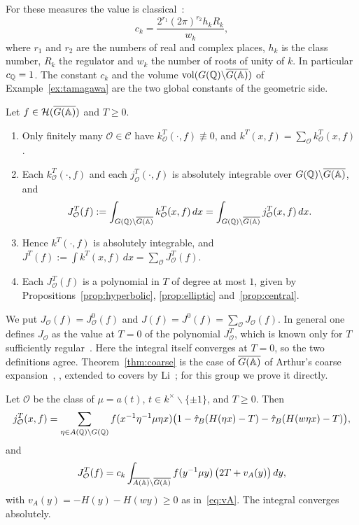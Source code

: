 For these measures the value is classical~\cite{Ta67}:
\[
c_k=\frac{2^{r_1}(2\pi)^{r_2}h_kR_k}{w_k},
\]
where $r_1$ and $r_2$ are the numbers of real and complex places, $h_k$
is the class number, $R_k$ the regulator and $w_k$ the number of roots of
unity of $k$. In particular $c_{\mathbb{Q}}=1$. The constant $c_k$ and the volume
$\operatorname{vol}(G(\mathbb{Q})\backslash\overline{G(\mathbb{A})})$ of Example~\ref{ex:tamagawa} are the two global
constants of the geometric side.

\begin{theorem}\label{thm:coarse}
Let $f\in\mathcal H(\overline{G(\mathbb{A})})$ and $T\ge0$.
\begin{enumerate}[label=(\alph*)]
\item Only finitely many $\mathcal O\in\mathcal C$ have
  $k^T_{\mathcal O}(\cdot,f)\not\equiv0$, and $k^T(x,f)=
  \sum_{\mathcal O}k^T_{\mathcal O}(x,f)$.
\item Each $k^T_{\mathcal O}(\cdot,f)$ and each
  $j^T_{\mathcal O}(\cdot,f)$ is absolutely integrable over
  $G(\mathbb{Q})\backslash\overline{G(\mathbb{A})}$, and
  \[
  J^T_{\mathcal O}(f):=\int_{G(\mathbb{Q})\backslash\overline{G(\mathbb{A})}}k^T_{\mathcal O}(x,f)\,dx
  =\int_{G(\mathbb{Q})\backslash\overline{G(\mathbb{A})}}j^T_{\mathcal O}(x,f)\,dx.
  \]
\item Hence $k^T(\cdot,f)$ is absolutely integrable, and
  $J^T(f):=\int k^T(x,f)\,dx=\sum_{\mathcal O}J^T_{\mathcal O}(f)$.
\item Each $J^T_{\mathcal O}(f)$ is a polynomial in $T$ of degree at
  most $1$, given by Propositions~\ref{prop:hyperbolic},
  \ref{prop:elliptic} and~\ref{prop:central}.
\end{enumerate}
\end{theorem}

We put $J_{\mathcal O}(f)=J^0_{\mathcal O}(f)$ and $J(f)=J^0(f)=
\sum_{\mathcal O}J_{\mathcal O}(f)$. In general one defines $J_{\mathcal
O}$ as the value at $T=0$ of the polynomial $J^T_{\mathcal O}$, which is
known only for $T$ sufficiently regular~\cite{Ar80,Ar05}. Here the integral
itself converges at $T=0$, so the two definitions agree.
Theorem~\ref{thm:coarse} is the case of $\overline{G(\mathbb{A})}$ of Arthur's coarse
expansion~\cite[\S\S7--8]{Ar78}, \cite{Ar80}, extended to covers by
Li~\cite{Li14a}; for this group we prove it directly.

\begin{proposition}\label{prop:hyperbolic}
Let $\mathcal O$ be the class of $\mu=a(t)$, $t\in k^\times
\smallsetminus\{\pm1\}$, and $T\ge0$. Then
\begin{equation}\label{eq:jT-hyp}
j^T_{\mathcal O}(x,f)=\sum_{\eta\in A(\mathbb{Q})\backslash G(\mathbb{Q})}
f(x^{-1}\eta^{-1}\mu\eta x)\bigl(1-\hat\tau_B(H(\eta x)-T)
-\hat\tau_B(H(w\eta x)-T)\bigr),
\end{equation}
and
\begin{equation}\label{eq:JT-hyp}
J^T_{\mathcal O}(f)=c_k\int_{\overline{A(\mathbb{A})}\backslash\overline{G(\mathbb{A})}}
f(y^{-1}\mu y)\,\bigl(2T+v_A(y)\bigr)\,dy,
\end{equation}
with $v_A(y)=-H(y)-H(wy)\ge0$ as in~\eqref{eq:vA}. The integral converges
absolutely.
\end{proposition}

